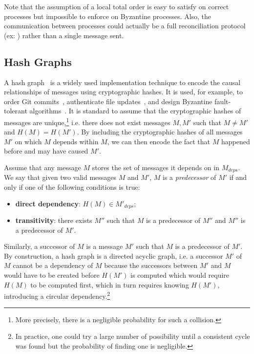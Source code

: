 \documentclass[9pt, oneside]{article}   	%
\begin{document}
Note that the assumption of a local total order is easy to satisfy on correct processes but impossible to enforce on Byzantine processes. Also, the communication between processes could actually be a full reconciliation protocol (ex: \cite{kleppmann2020bec}) rather than a single message sent. 

\subsection{Hash Graphs}
\label{sec:background:hash-graph}

A hash graph~\cite{jacob2022bft-crdt,Kleppmann2022byzantine} is a widely used implementation technique to encode the causal relationships of messages using cryptographic hashes. It is used, for example, to order Git commits~\cite{git-commit}, authenticate file updates~\cite{mahajan2011depot}, and design Byzantine fault-tolerant algorithms~\cite{maniatis2002secure-timeline-entanglement, cachin2011introduction,kleppmann2020bec, Kleppmann2022byzantine}. It is standard to assume that the cryptographic hashes of messages are unique,\footnote{More precisely, there is a negligible probability for such a collision.} i.e. there does not exist messages $M, M'$ such that $M \neq M'$ and $H(M) = H(M')$. By including the cryptographic hashes of all messages $M'$ on which $M$ depends within $M$, we can then encode the fact that $M$ happened before and may have caused $M'$. 

Assume that any message $M$ stores the set of messages it depends on in $M_\textit{deps}$. We say that given two valid messages $M$ and $M'$, $M$ is a \textit{predecessor} of $M'$ if and only if one of the following conditions is true:
\begin{itemize}
	\item \textbf{direct dependency}: $H(M) \in M'_\textit{deps}$;
	\item \textbf{transitivity}: there exists $M''$ such that $M$ is a predecessor of $M''$ and $M''$ is a predecessor of $M'$.
\end{itemize}

Similarly, a successor of $M$ is a message $M'$ such that $M$ is a predecessor of $M'$. By construction, a hash graph is a directed acyclic graph, i.e. a successor $M'$ of $M$ cannot be a dependency of $M$ because the successors between $M'$ and $M$ would have to be created before $H(M')$ is computed which would require $H(M)$ to be computed first, which in turn requires knowing $H(M')$, introducing a circular dependency.\footnote{In practice, one could try a large number of possibility until a consistent cycle was found but the probability of finding one is negligible.}
\end{document}

